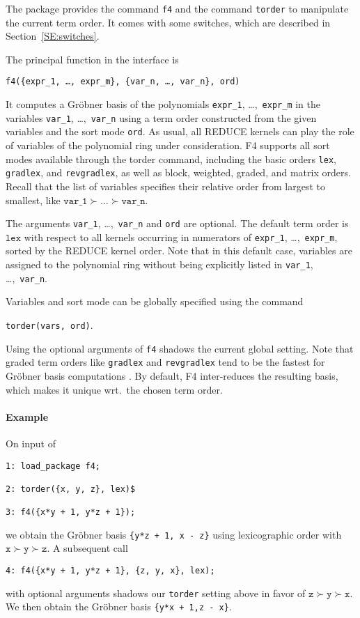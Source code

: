 \documentclass{article}
\newcommand{\grobner}{Gr\"obner}
\newcommand{\code}[1]{\texttt{#1}}
\begin{document}
The package provides the command \code{f4} and the command \code{torder} to manipulate the current
term order. It comes with some switches, which are described in Section~\ref{SE:switches}.

The principal function in the interface is
%
\begin{center}
    \code{f4(\{expr\_1, \ldots, expr\_m\}, \{var\_n, \ldots, var\_n\}, ord)}
\end{center}
%
It computes a \grobner{} basis of the polynomials \code {expr\_1}, \dots,~\code{expr\_m} in the variables 
\code{var\_1}, \dots,~\code{var\_n} using a
term order constructed from the given variables and the sort mode \code{ord}. As usual, all REDUCE
kernels can play the role of variables of the polynomial ring under consideration. F4 supports all sort modes
available through the torder command, including the basic orders \code{lex}, 
\code{gradlex}, and \code{revgradlex}, as well as block, weighted, graded, and matrix orders. 
Recall that the list of variables
specifies their relative order from largest to smallest, like $\code{var\_1} \succ \dots \succ
\code{var\_n}$.

The arguments \code{var\_1}, \dots,~\code{var\_n} and \code{ord} are optional. The default term
order is $\code{lex}$ with respect to all kernels occurring in numerators of \code{expr\_1},
\dots,~\code{expr\_m}, sorted by the REDUCE kernel order. Note that in this default case, variables
are assigned to the polynomial ring without being explicitly listed in \code{var\_1},
\dots,~\code{var\_n}.

Variables and sort mode can be globally specified using the command
%
\begin{center}
    \code{torder(vars, ord)}.
\end{center}
%
Using the optional arguments of \code{f4} shadows the current global
setting. Note that graded term orders like
\code{gradlex} and \code{revgradlex} tend to be the fastest for \grobner{}
basis computations \cite[\S5]{tolstaya}. By default, F4 inter-reduces the resulting basis, 
which makes it unique wrt.~the chosen term order.
%
\paragraph{Example}
On input of
\begin{verbatim}
1: load_package f4;

2: torder({x, y, z}, lex)$

3: f4({x*y + 1, y*z + 1});
\end{verbatim}
we obtain the \grobner{} basis
\code{\{y*z + 1, x - z\}} using lexicographic order with $\code{x} \succ
\code{y} \succ \code{z}$. A subsequent call
\begin{verbatim}
4: f4({x*y + 1, y*z + 1}, {z, y, x}, lex);
\end{verbatim}
with optional arguments shadows our \code{torder} setting above in favor of $
\code{z}
\succ \code{y} \succ \code{x}$. We then obtain the \grobner{} basis
\code{\{y*x + 1,z - x\}}.
%
\end{document}
